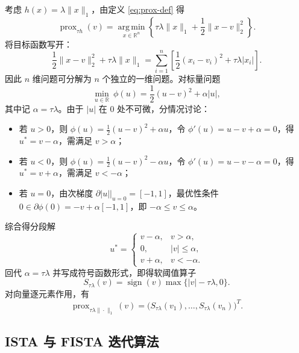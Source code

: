 \documentclass[UTF8]{ctexart}
\numberwithin{figure}{section}
\theoremstyle{definition}
\theoremstyle{examplestyle}
\theoremstyle{remark}
\begin{document}
考虑 $h(x)=\lambda\|x\|_1$，由定义 \eqref{eq:prox-def} 得
\begin{equation}
\label{eq:prox-l1}
\operatorname{prox}_{\tau h}(v)=\operatorname*{arg\,min}_{x\in\mathbb{R}^n}\left\{\tau\lambda\|x\|_1+\frac{1}{2}\|x-v\|_2^2\right\}.
\end{equation}
将目标函数写开：
\[
\frac{1}{2}\|x-v\|_2^2+\tau\lambda\|x\|_1
=\sum_{i=1}^n\left[\frac{1}{2}(x_i-v_i)^2+\tau\lambda|x_i|\right].
\]
因此 $n$ 维问题可分解为 $n$ 个独立的一维问题。对标量问题
\[
\min_{u\in\mathbb{R}}\ \phi(u)=\frac{1}{2}(u-v)^2+\alpha|u|,
\]
其中记 $\alpha=\tau\lambda$。由于 $|u|$ 在 $0$ 处不可微，分情况讨论：
\begin{itemize}
\item 若 $u>0$，则 $\phi(u)=\frac{1}{2}(u-v)^2+\alpha u$，令 $\phi'(u)=u-v+\alpha=0$，得 $u^*=v-\alpha$，需满足 $v>\alpha$；
\item 若 $u<0$，则 $\phi(u)=\frac{1}{2}(u-v)^2-\alpha u$，令 $\phi'(u)=u-v-\alpha=0$，得 $u^*=v+\alpha$，需满足 $v<-\alpha$；
\item 若 $u=0$，由次梯度 $\partial|u|\big|_{u=0}=[-1,1]$，最优性条件 $0\in\partial\phi(0)=-v+\alpha[-1,1]$，即 $-\alpha\le v\le\alpha$。
\end{itemize}
综合得分段解
\begin{equation}
\label{eq:soft-threshold-scalar}
u^*=
\begin{cases}
v-\alpha, & v>\alpha,\\
0, & |v|\le\alpha,\\
v+\alpha, & v<-\alpha.
\end{cases}
\end{equation}
回代 $\alpha=\tau\lambda$ 并写成符号函数形式，即得软阈值算子
\begin{equation}
\label{eq:soft-threshold}
S_{\tau\lambda}(v)=\operatorname{sign}(v)\max\{|v|-\tau\lambda,0\}.
\end{equation}
对向量逐元素作用，有
\begin{equation}
\label{eq:prox-l1-closed}
\operatorname{prox}_{\tau\lambda\|\cdot\|_1}(v)=\bigl(S_{\tau\lambda}(v_1),\dots,S_{\tau\lambda}(v_n)\bigr)^T.
\end{equation}

\subsection{ISTA 与 FISTA 迭代算法}
\label{sec:ista-fista}
\end{document}
